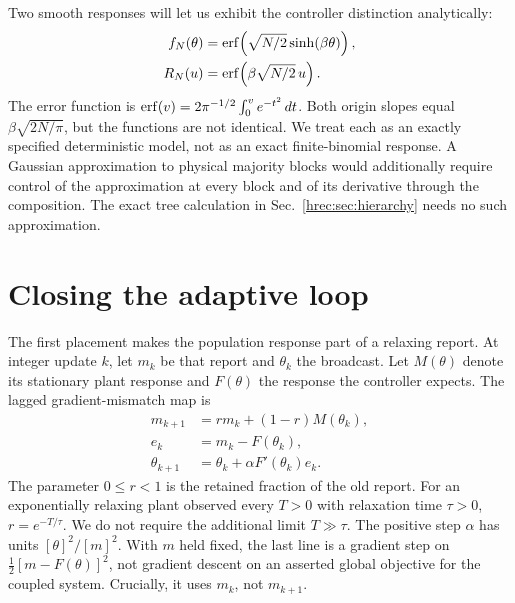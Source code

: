 Two smooth responses will let us exhibit the controller distinction analytically:
\begin{equation}
 \begin{aligned}
 f_N(\theta)&=\operatorname{erf}\!\left(\sqrt{N/2}\sinh(\beta\theta)\right),\\
 R_N(u)&=\operatorname{erf}\!\left(\beta\sqrt{N/2}\,u\right).
 \end{aligned}
 \label{hrec:eq:proxies}
\end{equation}
The error function is \(\operatorname{erf}(v)=2\pi^{-1/2}\int_0^v e^{-t^2}\,dt\). Both origin slopes equal \(\beta\sqrt{2N/\pi}\), but the functions are not identical. We treat each as an exactly specified deterministic model, not as an exact finite-binomial response. A Gaussian approximation to physical majority blocks would additionally require control of the approximation at every block and of its derivative through the composition. The exact tree calculation in Sec.~\ref{hrec:sec:hierarchy} needs no such approximation.

\section{Closing the adaptive loop}
\label{hrec:sec:loop}
The first placement makes the population response part of a relaxing report. At integer update \(k\), let \(m_k\) be that report and \(\theta_k\) the broadcast. Let \(M(\theta)\) denote its stationary plant response and \(F(\theta)\) the response the controller expects. The lagged gradient-mismatch map is
\begin{align}
 m_{k+1}&=r m_k+(1-r)M(\theta_k),\nonumber\\
 e_k&=m_k-F(\theta_k),\nonumber\\
 \theta_{k+1}&=\theta_k+\alpha F'(\theta_k)e_k.
 \label{hrec:eq:lagged}
\end{align}
The parameter \(0\le r<1\) is the retained fraction of the old report. For an exponentially relaxing plant observed every \(T>0\) with relaxation time \(\tau>0\), \(r=e^{-T/\tau}\). We do not require the additional limit \(T\gg\tau\). The positive step \(\alpha\) has units \([\theta]^2/[m]^2\). With \(m\) held fixed, the last line is a gradient step on \(\tfrac12[m-F(\theta)]^2\), not gradient descent on an asserted global objective for the coupled system. Crucially, it uses \(m_k\), not \(m_{k+1}\).

